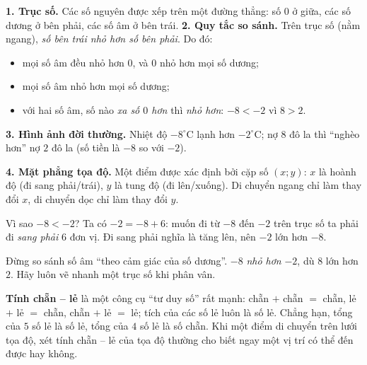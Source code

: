 \begin{knowbox}
\textbf{1. Trục số.} Các số nguyên được xếp trên một đường thẳng: số $0$ ở giữa, các số dương ở bên phải, các số âm
ở bên trái.
\textbf{2. Quy tắc so sánh.} Trên trục số (nằm ngang), \emph{số bên trái nhỏ hơn số bên phải}. Do đó:
\begin{itemize}[leftmargin=1.4em,itemsep=1pt,topsep=2pt]
  \item mọi số âm đều nhỏ hơn $0$, và $0$ nhỏ hơn mọi số dương;
  \item mọi số âm nhỏ hơn mọi số dương;
  \item với hai số âm, số nào \emph{xa số $0$ hơn} thì \emph{nhỏ hơn}: $-8 < -2$ vì $8 > 2$.
\end{itemize}
\textbf{3. Hình ảnh đời thường.} Nhiệt độ $-8^\circ$C lạnh hơn $-2^\circ$C; nợ $8$ đô la thì ``nghèo hơn'' nợ
$2$ đô la (số tiền là $-8$ so với $-2$).

\textbf{4. Mặt phẳng tọa độ.} Một điểm được xác định bởi cặp số $(x;y)$: $x$ là hoành độ (đi sang phải/trái),
$y$ là tung độ (đi lên/xuống). Di chuyển ngang chỉ làm thay đổi $x$, di chuyển dọc chỉ làm thay đổi $y$.
\end{knowbox}
\begin{proofbox}
Vì sao $-8 < -2$? Ta có $-2 = -8 + 6$: muốn đi từ $-8$ đến $-2$ trên trục số ta phải đi \emph{sang phải} $6$ đơn vị.
Đi sang phải nghĩa là tăng lên, nên $-2$ lớn hơn $-8$.
\end{proofbox}
\begin{warnbox}
Đừng so sánh số âm ``theo cảm giác của số dương''. $-8$ \emph{nhỏ hơn} $-2$, dù $8$ lớn hơn $2$. Hãy luôn vẽ
nhanh một trục số khi phân vân.
\end{warnbox}
\begin{tipbox}
\textbf{Tính chẵn -- lẻ} là một công cụ ``tư duy số'' rất mạnh: chẵn $+$ chẵn $=$ chẵn, lẻ $+$ lẻ $=$ chẵn, chẵn $+$ lẻ $=$ lẻ;
tích của các số lẻ luôn là số lẻ. Chẳng hạn, tổng của $5$ số lẻ là số lẻ, tổng của $4$ số lẻ là số chẵn. Khi một điểm
di chuyển trên lưới tọa độ, xét tính chẵn -- lẻ của tọa độ thường cho biết ngay một vị trí có thể đến được hay không.
\end{tipbox}

